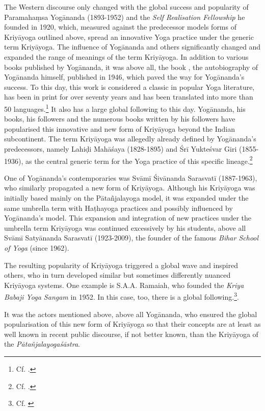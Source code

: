 The Western discourse only changed with the global success and popularity of Paramahaṃsa Yogānanda (1893-1952) and the \textit{Self Realisation Fellowship} he founded in 1920, which, measured against the predecessor models forms of Kriyāyoga outlined above, spread an innovative Yoga practice under the generic term Kriyāyoga. The influence of Yogānanda and others significantly changed and expanded the range of meanings of the term Kriyāyoga. In addition to various books published by Yogānanda, it was above all, the book , the autobiography of Yogānanda himself, published in 1946, which paved the way for Yogānanda's success. To this day, this work is considered a classic in popular Yoga literature, has been in print for over seventy years and has been translated into more than 50 languages.\footnote{Cf. \cite{yoganandawebsite}.} It also has a large global following to this day. Yogānanda, his books, his followers and the numerous books written by his followers have popularised this innovative and new form of Kriyāyoga beyond the Indian subcontinent. The term Kriyāyoga was allegedly already defined by Yogānanda's predecessors, namely Lahiḍi Mahāśaya (1828-1895) and Śrī Yukteśvar Giri (1855-1936), as the central generic term for the Yoga practice of this specific lineage.\footnote{Cf. \citeauthor[2010: 51-52]{govindan2010}.} 

One of Yogānanda's contemporaries was Svāmī Śivānanda Sarasvatī (1887-1963), who similarly propagated a new form of Kriyāyoga. Although his Kriyāyoga was initially based mainly on the Pātañjalayoga model, it was expanded under the same umbrella term with Haṭhayoga practices and possibly influenced by Yogānanda's model. This expansion and integration of new practices under the umbrella term Kriyāyoga was continued excessively by his students, above all Svāmī Satyānanda Sarasvatī (1923-2009), the founder of the famous \textit{Bihar School of Yoga} (since 1962).

The resulting popularity of Kriyāyoga triggered a global wave and inspired others, who in turn developed similar but sometimes differently nuanced Kriyāyoga systems. One example is S.A.A. Ramaiah, who founded the \textit{Kriya Babaji Yoga Sangam} in 1952. In this case, too, there is a global following.\footnote{Cf. \cite{kriyababajiyoga}}.

It was the actors mentioned above, above all Yogānanda, who ensured the global popularisation of this new form of Kriyāyoga so that their concepts are at least as well known in recent public discourse, if not better known, than the Kriyāyoga of the \textit{Pātañjalayogaśāstra}.

